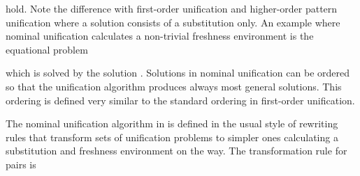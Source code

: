 \begin{isabellebody}
\begin{isamarkuptext}
  \noindent
  hold. Note the difference with first-order unification and higher-order pattern unification
  where a solution consists of a substitution only. An example where nominal unification
  calculates a non-trivial
  freshness environment is the equational problem

  \begin{center}
  \end{center}

  \noindent
  which is solved by the solution .
  Solutions in nominal unification can be ordered so that the unification 
  algorithm produces always most general solutions.  This ordering is defined
  very similar to the standard ordering in first-order unification.

  The nominal unification algorithm
  in \cite{UrbanPittsGabbay04} is defined in the usual style of rewriting rules that transform
  sets of unification problems to simpler ones calculating a substitution and
  freshness environment on the way. The transformation rule for pairs is


\end{isamarkuptext}
\end{isabellebody}
